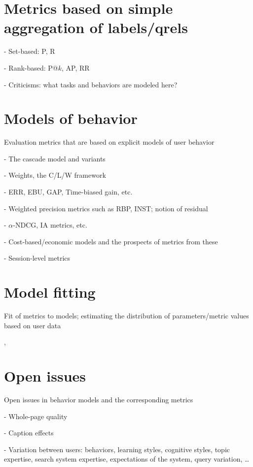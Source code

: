 \documentclass[openany]{now} %
\begin{document}
\section{Metrics based on simple aggregation of labels/qrels}

- Set-based: P, R

- Rank-based: P@$k$, AP, RR

- Criticisms: what tasks and behaviors are modeled here?

\section{Models of behavior}

Evaluation metrics that are based on explicit models of user behavior

- The cascade model and variants

- Weights, the C/L/W framework \citep{Moffat2013}

- ERR, EBU, GAP, Time-biased gain, etc.

- Weighted precision metrics such as RBP, INST; notion of residual \citep{Moffat08,Moffat15}

- $\alpha$-NDCG, IA metrics, etc.

- Cost-based/economic models and the prospects of metrics from these

- Session-level metrics \cite{kanoulas2011evaluating} \cite{Järvelin2008}

\section{Model fitting}

Fit of metrics to models; estimating the distribution of parameters/metric values based on user data

\cite{CarteretteKY11}, \cite{Moffat2013}

\section{Open issues}

Open issues in behavior models and the corresponding metrics

- Whole-page quality

- Caption effects

- Variation between users: behaviors, learning styles, cognitive styles, topic expertise, search system expertise, expectations of the system, query variation, \dots
\end{document}
